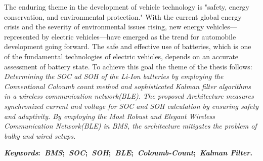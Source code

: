 \thispagestyle{empty} 
The enduring theme in the development of vehicle technology is "safety, energy conservation, and environmental protection." With the current global energy crisis and the severity of environmental issues rising, new energy vehicles—represented by electric vehicles—have emerged as the trend for automobile development going forward. The safe and effective use of batteries, which is one of the fundamental technologies of electric vehicles, depends on an accurate assessment of battery state.
To achieve this goal the theme of the thesis follows:\\
\noindent \textit{
    Determining the SOC ad SOH of the Li-Ion batteries by employing the Conventional Coloumb count method and sophisticated Kalman filter algorithms in a wireless communication network(BLE). 
    The proposed Architecture measures synchronized current and voltage for SOC and SOH calculation by ensuring safety and adaptivity. 
    By employing the Most Robust and Elegant Wireless Communication Network(BLE) in BMS, the architecture mitigates the problem of bulky and wired setups.
}




\vspace{5mm}
\noindent\textbf{\textit{Keywords}:~\textit{BMS};~\textit{SOC};~\textit{SOH};~\textit{BLE};~\textit{Coloumb-Count};~\textit{Kalman Filter}.}
